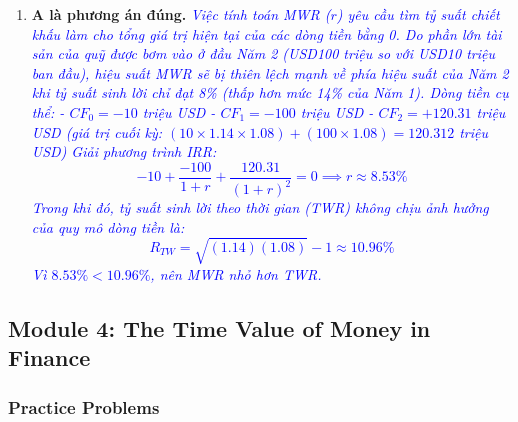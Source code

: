 \begin{enumerate}
	\item \textbf{A là phương án đúng.} \textcolor{blue}{\textit{Việc tính toán MWR ($r$) yêu cầu tìm tỷ suất chiết khấu làm cho tổng giá trị hiện tại của các dòng tiền bằng 0. Do phần lớn tài sản của quỹ được bơm vào ở đầu Năm 2 (USD100 triệu so với USD10 triệu ban đầu), hiệu suất MWR sẽ bị thiên lệch mạnh về phía hiệu suất của Năm 2 khi tỷ suất sinh lời chỉ đạt 8\% (thấp hơn mức 14\% của Năm 1).
	      Dòng tiền cụ thể:
	      - $CF_0 = -10$ triệu USD
	      - $CF_1 = -100$ triệu USD
	      - $CF_2 = +120.31$ triệu USD (giá trị cuối kỳ: $(10 \times 1.14 \times 1.08) + (100 \times 1.08) = 120.312$ triệu USD)
	      Giải phương trình IRR:
	      \[
	      -10 + \frac{-100}{1+r} + \frac{120.31}{(1+r)^2} = 0 \implies r \approx 8.53\%
	      \]
	      Trong khi đó, tỷ suất sinh lời theo thời gian (TWR) không chịu ảnh hưởng của quy mô dòng tiền là:
	      \[
	      R_{TW} = \sqrt{(1.14)(1.08)} - 1 \approx 10.96\%
	      \]
	      Vì $8.53\% < 10.96\%$, nên MWR nhỏ hơn TWR.}}
\end{enumerate}

\newpage

\subsection{Module 4: The Time Value of Money in Finance}
\label{sec:app_Problems_M4}

\subsubsection{Practice Problems}
\label{subsec:app_Problems_M4}

